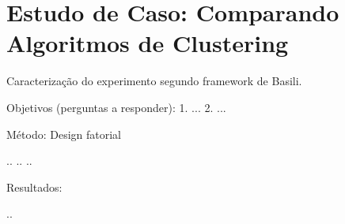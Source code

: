 
\chapter{Estudo de Caso: Comparando Algoritmos de Clustering} \label{cap:estudo}

Caracterização do experimento segundo framework de Basili.

Objetivos (perguntas a responder):
1. ...
2. ...

Método:
Design fatorial

..
..
..

Resultados:

..
 
